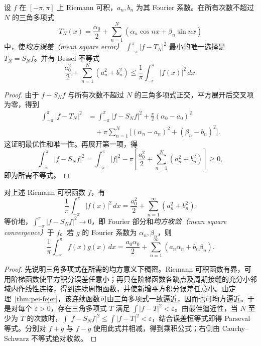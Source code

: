 \begin{theorem}
\label{thm:pei-bessel}
设 $f$ 在 $[-\pi,\pi]$ 上 Riemann 可积，$a_n,b_n$ 为其 Fourier 系数。在所有次数不超过 $N$ 的三角多项式
\[
 T_N(x)=\frac{\alpha_0}{2}+\sum_{n=1}^{N}(\alpha_n\cos nx+\beta_n\sin nx)
\]
中，使\emph{均方误差（mean square error）} $\int_{-\pi}^{\pi}|f-T_N|^2$ 最小的唯一选择是 $T_N=S_Nf$。并有 Bessel 不等式
\begin{equation}
 \frac{a_0^2}{2}+\sum_{n=1}^{N}(a_n^2+b_n^2)
 \leq\frac1\pi\int_{-\pi}^{\pi}|f(x)|^2\,dx.
 \label{eq:pei-bessel}
\end{equation}
\end{theorem}
\begin{proof}
由于 $f-S_Nf$ 与所有次数不超过 $N$ 的三角多项式正交，平方展开后交叉项为零，得到
\begin{align*}
 \int_{-\pi}^{\pi}|f-T_N|^2
 &=\int_{-\pi}^{\pi}|f-S_Nf|^2
 +\frac\pi2(\alpha_0-a_0)^2\\
 &\quad+\pi\sum_{n=1}^{N}\bigl[(\alpha_n-a_n)^2+(\beta_n-b_n)^2\bigr].
\end{align*}
这证明最优性和唯一性。再展开第一项，得
\[
 \int_{-\pi}^{\pi}|f-S_Nf|^2
 =\int_{-\pi}^{\pi}|f|^2-\pi\left[\frac{a_0^2}{2}+\sum_{n=1}^{N}(a_n^2+b_n^2)\right]\geq0,
\]
即为所需不等式。
\end{proof}

\begin{theorem}[Parseval 等式]
\label{thm:pei-parseval}
对上述 Riemann 可积函数 $f$，有
\begin{equation}
 \frac1\pi\int_{-\pi}^{\pi}|f(x)|^2\,dx
 =\frac{a_0^2}{2}+\sum_{n=1}^{\infty}(a_n^2+b_n^2).
 \label{eq:pei-parseval}
\end{equation}
等价地，$\int_{-\pi}^{\pi}|f-S_Nf|^2\to0$，即 Fourier 部分和\emph{均方收敛（mean square convergence）}于 $f$。若 $g$ 的 Fourier 系数为 $\alpha_n,\beta_n$，则
\[
 \frac1\pi\int_{-\pi}^{\pi}f(x)g(x)\,dx
 =\frac{a_0\alpha_0}{2}+\sum_{n=1}^{\infty}(a_n\alpha_n+b_n\beta_n).
\]
\end{theorem}
\begin{proof}
先说明三角多项式在所需的均方意义下稠密。Riemann 可积函数有界，可用阶梯函数使平方积分误差任意小；再只在阶梯函数各跳点及周期接缝的充分小邻域内作线性连接，得到连续周期函数，并使新增平方积分误差任意小。由定理~\ref{thm:pei-fejer}，该连续函数可由三角多项式一致逼近，因而也可均方逼近。于是对每个 $\varepsilon>0$，存在三角多项式 $T$ 满足 $\int|f-T|^2<\varepsilon$。由最佳逼近性，当 $N$ 至少为 $T$ 的次数时，$\int|f-S_Nf|^2\leq\int|f-T|^2<\varepsilon$，结合误差恒等式即得 Parseval 等式。分别对 $f+g$ 与 $f-g$ 使用此式并相减，得到乘积公式；右侧由 Cauchy--Schwarz 不等式绝对收敛。
\end{proof}

